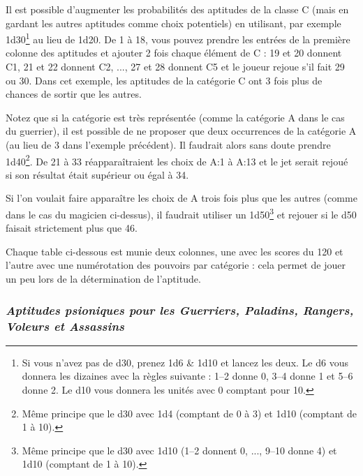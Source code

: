 \documentclass[11pt]{article}
\begin{document}
{\bigskip

Il est possible d'augmenter les probabilités des aptitudes de la classe C (mais en gardant les autres aptitudes comme choix potentiels) en utilisant, par exemple 1d30\footnote{Si vous n'avez pas de d30, prenez 1d6 \& 1d10 et lancez les deux. Le d6 vous donnera les dizaines avec la règles suivante : 1--2 donne 0, 3--4 donne 1 et 5--6 donne 2. Le d10 vous donnera les unités avec 0 comptant pour 10.} au lieu de 1d20. De 1 à 18, vous pouvez prendre les entrées de la première colonne des aptitudes et ajouter 2 fois chaque élément de C : 19 et 20 donnent C1, 21 et 22 donnent C2, ..., 27 et 28 donnent C5 et le joueur rejoue s'il fait 29 ou 30. Dans cet exemple, les aptitudes de la catégorie C ont 3 fois plus de chances de sortir que les autres.

\bigskip

Notez que si la catégorie est très représentée (comme la catégorie A dans le cas du guerrier), il est possible de ne proposer que deux occurrences de la catégorie A (au lieu de 3 dans l'exemple précédent). Il faudrait alors sans doute prendre 1d40\footnote{Même principe que le d30 avec 1d4 (comptant de 0 à 3) et 1d10 (comptant de 1 à 10).}. De 21 à 33 réapparaîtraient les choix de A:1 à A:13 et le jet serait rejoué si son résultat était supérieur ou égal à 34.

\bigskip

Si l'on voulait faire apparaître les choix de A trois fois plus que les autres (comme dans le cas du magicien ci-dessus), il faudrait utiliser un 1d50\footnote{Même principe que le d30 avec 1d10 (1--2 donnent 0, ..., 9--10 donne 4) et 1d10 (comptant de 1 à 10).} et rejouer si le d50 faisait strictement plus que 46.

\bigskip

Chaque table ci-dessous est munie deux colonnes, une avec les scores du 120 et l'autre avec une numérotation des pouvoirs par catégorie : cela permet de jouer un peu lors de la détermination de l'aptitude.

\newpage
\subsubsection*{\textit{Aptitudes psioniques pour les Guerriers, Paladins, Rangers, Voleurs et Assassins}}

}
\end{document}
